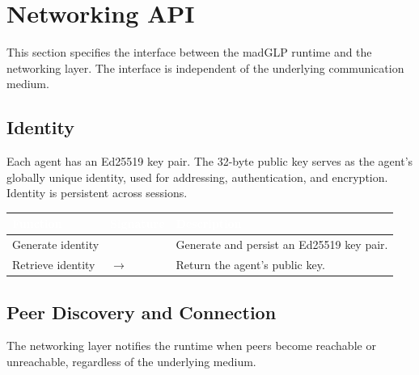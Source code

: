 \section{Networking API}
\label{sec:api}
This section specifies the interface between the madGLP runtime and the networking layer. The interface is independent of the underlying communication medium.
\subsection{Identity}
\label{sec:identity}
Each agent has an Ed25519 key pair. The 32-byte public key serves as the agent's globally unique identity, used for addressing, authentication, and encryption. Identity is persistent across sessions.
\begin{longtable}{L{4cm} L{4.5cm} L{5.5cm}}
\toprule
{}
\textcolor{white}{\textbf{Function}} &
\textcolor{white}{\textbf{Signature}} &
\textcolor{white}{\textbf{Description}} \\
\midrule
\endhead
Generate identity &  & Generate and persist an Ed25519 key pair. \\
Retrieve identity &  $\to$  & Return the agent's public key. \\
\bottomrule
\end{longtable}
\subsection{Peer Discovery and Connection}
\label{sec:discovery}
The networking layer notifies the runtime when peers become reachable or unreachable, regardless of the underlying medium.

